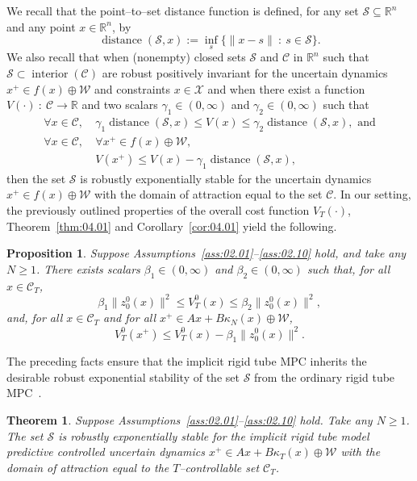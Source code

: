 \documentclass[twocolumn]{autart}
\newtheorem{theorem}{Theorem}
\newtheorem{proposition}{Proposition}
\newcommand{\mb}[1]{\mathbb{#1}}
\newcommand{\mc}[1]{\mathcal{#1}}
\newcommand{\bb}{\left(\cdot\right)}
\newcommand{\R}{\mb{R}}
\numberwithin{equation}{section}
\begin{document}
We recall that the point--to--set distance function is defined, for any set $\mc{S}\subseteq \R^n$ and any point $x\in\R^n$, by 
\begin{equation*}
\operatorname{distance}(\mc{S},x):=\inf_{s}\{\|x-s\|\ :\ s\in\mc{S}\}.
\end{equation*}
 We also recall that when (nonempty) closed sets $\mc{S}$ and $\mc{C}$ in $\R^n$ such that $\mc{S}\subset \operatorname{interior}(\mc{C})$ are robust positively invariant  for the uncertain dynamics $x^+\in f(x)\oplus \mc{W}$ and constraints $x\in\mc{X}$ and when there exist a function $V\bb\ :\ \mc{C}\rightarrow \R$ and two scalars $\gamma_1\in(0,\infty)$ and $\gamma_2\in(0,\infty)$ such that
\begin{align*}
\forall x\in \mc{C},\  &\gamma_1\operatorname{distance}(\mc{S},x)\le V(x)\le \gamma_2\operatorname{distance}(\mc{S},x),\text{ and}\\
\forall x\in \mc{C},\  &\forall x^+\in f(x)\oplus \mc{W},\\
 &V(x^+)\le V(x) -\gamma_1\operatorname{distance}(\mc{S},x),
\end{align*}
then the set $\mc{S}$ is robustly exponentially stable  for the uncertain dynamics $x^+\in f(x)\oplus \mc{W}$  with the domain of attraction equal to the set $\mc{C}$.  In our setting, the previously outlined properties of the overall cost function $V_T\bb$, Theorem~\ref{thm:04.01} and Corollary~\ref{cor:04.01} yield the following.
\begin{proposition}
\label{prop:04.03}
Suppose Assumptions~\ref{ass:02.01}--\ref{ass:02.10} hold, and take any $N\ge 1$. There exists scalars $\beta_1\in (0,\infty)$ and $\beta_2\in(0,\infty)$ such that, for all $x\in\mc{C}_T$,
\begin{equation*}
\beta_1\|z_0^0(x)\|^2\le V_T^0(x)\le \beta_2\|z_0^0(x)\|^2,
\end{equation*}
and, for all $x\in\mc{C}_T$ and for all $x^+\in Ax+B\kappa_N(x)\oplus \mc{W}$,
\begin{equation*}
V_T^0(x^+)\le V_T^0(x) -\beta_1\|z_0^0(x)\|^2.
\end{equation*}
\end{proposition}
The preceding facts ensure that the implicit rigid tube MPC inherits the desirable robust exponential stability of the set $\mc{S}$ from the ordinary rigid tube MPC~\cite{mayne:seron:rakovic:2005}.
\begin{theorem}
\label{thm:04.03}
Suppose Assumptions~\ref{ass:02.01}--\ref{ass:02.10} hold. Take any $N\ge 1$. The set $\mc{S}$ is robustly exponentially stable for the implicit rigid tube model predictive controlled uncertain dynamics  $x^+\in Ax+B\kappa_T(x)\oplus \mc{W}$ with the domain of attraction equal to the $T$--controllable set $\mc{C}_T$.
\end{theorem}
\end{document}
